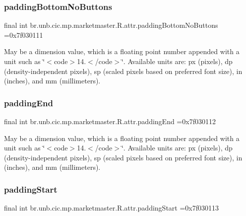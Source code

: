 \subsubsection{\texorpdfstring{padding\+Bottom\+No\+Buttons}{paddingBottomNoButtons}}
{\footnotesize\ttfamily final int br.\+unb.\+cic.\+mp.\+marketmaster.\+R.\+attr.\+padding\+Bottom\+No\+Buttons =0x7f030111\hspace{0.3cm}{\ttfamily [static]}}

May be a dimension value, which is a floating point number appended with a unit such as \char`\"{}$<$code$>$14.\+5sp$<$/code$>$\char`\"{}. Available units are\+: px (pixels), dp (density-\/independent pixels), sp (scaled pixels based on preferred font size), in (inches), and mm (millimeters). \mbox{\label{classbr_1_1unb_1_1cic_1_1mp_1_1marketmaster_1_1R_1_1attr_aeb0e4cbfbd8ea24ab6ecbdd27a736875}} 
\subsubsection{\texorpdfstring{padding\+End}{paddingEnd}}
{\footnotesize\ttfamily final int br.\+unb.\+cic.\+mp.\+marketmaster.\+R.\+attr.\+padding\+End =0x7f030112\hspace{0.3cm}{\ttfamily [static]}}

May be a dimension value, which is a floating point number appended with a unit such as \char`\"{}$<$code$>$14.\+5sp$<$/code$>$\char`\"{}. Available units are\+: px (pixels), dp (density-\/independent pixels), sp (scaled pixels based on preferred font size), in (inches), and mm (millimeters). \mbox{\label{classbr_1_1unb_1_1cic_1_1mp_1_1marketmaster_1_1R_1_1attr_ad172b1d51f60eaff3bd1692a740c80b1}} 
\subsubsection{\texorpdfstring{padding\+Start}{paddingStart}}
{\footnotesize\ttfamily final int br.\+unb.\+cic.\+mp.\+marketmaster.\+R.\+attr.\+padding\+Start =0x7f030113\hspace{0.3cm}{\ttfamily [static]}}

